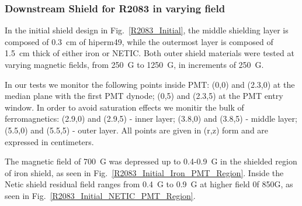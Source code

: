 \documentclass[12pt]{article}
\begin{document}





\subsubsection{Downstream Shield for R2083 in varying field} 
\label{R2083_Triple_No_Coil}
In the initial shield design in Fig.~\ref{R2083_Initial}, the middle shielding 
layer is composed of 0.3~cm of hiperm49, while the outermost layer is composed
 of 1.5~cm thick of either iron or NETIC. Both outer shield materials were
 tested at varying magnetic fields, from 250~G to 1250~G, in increments of 250~G.

In our tests we  monitor the following  points inside PMT:
   (0,0) and (2.3,0) at  the median plane with the  first PMT dynode;
   (0,5) and (2.3,5) at  the PMT entry window.
In order to avoid  saturation effects we monitir the bulk of ferromagnetics:
 (2.9,0) and (2.9,5) - inner layer; 
 (3.8,0) and (3.8,5) - middle layer; 
(5.5,0) and (5.5,5)  - outer layer.
All points are given in (r,z) form and are expressed in centimeters.





The  magnetic field of 700~G  was depressed up to 0.4-0.9~G in the shielded
 region of iron shield, as seen in Fig.~\ref{R2083_Initial_Iron_PMT_Region}. 
Inside the Netic 
 shield   residual field ranges from 0.4~G to 0.9~G at higher field 0f 850G,
 as seen  in Fig.~\ref{R2083_Initial_NETIC_PMT_Region}.
\end{document}
